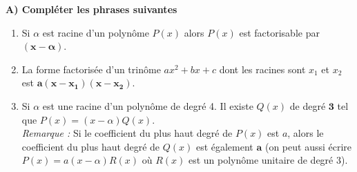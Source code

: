 \documentclass[12pt,a4paper]{article}
\begin{document}
\renewcommand{\arraystretch}{1.5}
\renewcommand{\arrayrulewidth}{1.2pt}

\vspace{3cm}


\textbf{A) Compléter les phrases suivantes}
\begin{enumerate}
    \item Si $\alpha$ est racine d'un polynôme $P(x)$ alors $P(x)$ est factorisable par $\mathbf{(x - \alpha)}$.
    \item La forme factorisée d'un trinôme $ax^2 + bx + c$ dont les racines sont $x_1$ et $x_2$ est $\mathbf{a(x - x_1)(x - x_2)}$.
    \item Si $\alpha$ est une racine d'un polynôme de degré 4. Il existe $Q(x)$ de degré $\mathbf{3}$ tel que $P(x) = (x - \alpha)Q(x)$. \\
    \textit{Remarque :} Si le coefficient du plus haut degré de $P(x)$ est $a$, alors le coefficient du plus haut degré de $Q(x)$ est également $\mathbf{a}$ (on peut aussi écrire $P(x) = a(x - \alpha)R(x)$ où $R(x)$ est un polynôme unitaire de degré $3$).
\end{enumerate}
\end{document}
